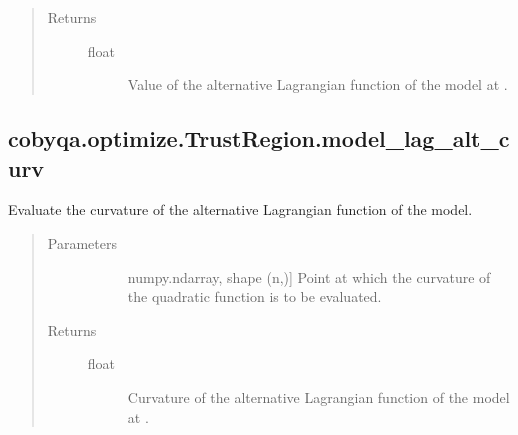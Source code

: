 \documentclass[letterpaper,10pt,english]{sphinxmanual}
\begin{document}
\begin{fulllineitems}
\begin{fulllineitems}
\begin{quote}
\begin{description}
\begin{description}
\end{description}

\item[{Returns}] \leavevmode\begin{description}
\item[{float}] \leavevmode
\sphinxAtStartPar
Value of the alternative Lagrangian function of the model at .

\end{description}

\end{description}\end{quote}

\end{fulllineitems}



\subsection{cobyqa.optimize.TrustRegion.model\_lag\_alt\_curv}
\label{\detokenize{refs/generated/cobyqa.optimize.TrustRegion.model_lag_alt_curv:cobyqa-optimize-trustregion-model-lag-alt-curv}}\label{\detokenize{refs/generated/cobyqa.optimize.TrustRegion.model_lag_alt_curv::doc}}

\begin{fulllineitems}
\label{\detokenize{refs/generated/cobyqa.optimize.TrustRegion.model_lag_alt_curv:cobyqa.optimize.TrustRegion.model_lag_alt_curv}}
\sphinxAtStartPar
Evaluate the curvature of the alternative Lagrangian function of the
model.
\begin{quote}\begin{description}
\item[{Parameters}] \leavevmode\begin{description}
\item[{}] \leavevmode{[}numpy.ndarray, shape (n,){]}
\sphinxAtStartPar
Point at which the curvature of the quadratic function is to be
evaluated.

\end{description}

\item[{Returns}] \leavevmode\begin{description}
\item[{float}] \leavevmode
\sphinxAtStartPar
Curvature of the alternative Lagrangian function of the model at
.


\end{description}
\end{description}
\end{quote}
\end{fulllineitems}
\end{fulllineitems}
\end{document}
